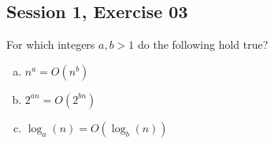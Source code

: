 \subsection{Session 1, Exercise 03}


For which integers $a,b > 1$ do the following hold true?

\begin{enumerate}[a.)]
\item $n^a = O(n^b)$
\item $2^{an} = O(2^{bn})$
\item $\log_a(n) = O(\log_b(n))$
\end{enumerate}

